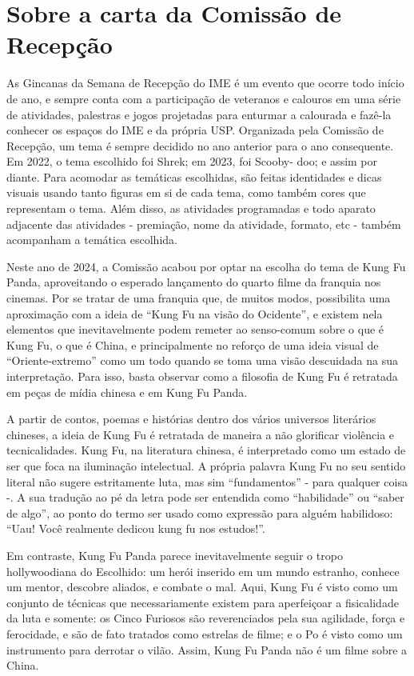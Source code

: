 \section*{Sobre a carta da Comissão de Recepção}
\avisoTextoForms

As Gincanas da Semana de Recepção do IME é um evento que ocorre todo início de ano, e sempre conta com a participação de veteranos e calouros em uma série de atividades, palestras e jogos projetadas para enturmar a calourada e fazê-la conhecer os espaços do IME e da própria USP. Organizada pela Comissão de Recepção, um tema é sempre decidido no ano anterior para o ano consequente. Em 2022, o tema escolhido foi Shrek; em 2023, foi Scooby- doo; e assim por diante. Para acomodar as temáticas escolhidas, são feitas identidades e dicas visuais usando tanto figuras em si de cada tema, como também cores que representam o tema. Além disso, as atividades programadas e todo aparato adjacente das atividades - premiação, nome da atividade, formato, etc - também acompanham a temática escolhida.

Neste ano de 2024, a Comissão acabou por optar na escolha do tema de Kung Fu Panda, aproveitando o esperado lançamento do quarto filme da franquia nos cinemas. Por se tratar de uma franquia que, de muitos modos, possibilita uma aproximação com a ideia de “Kung Fu na visão do Ocidente”, e existem nela elementos que inevitavelmente podem remeter ao senso-comum sobre o que é Kung Fu, o que é China, e principalmente no reforço de uma ideia visual de “Oriente-extremo” como um todo quando se toma uma visão descuidada na sua interpretação. Para isso, basta observar como a filosofia de Kung Fu é retratada em peças de mídia chinesa e em Kung Fu Panda.

A partir de contos, poemas e histórias dentro dos vários universos literários chineses, a ideia de Kung Fu é retratada de maneira a não glorificar violência e tecnicalidades. Kung Fu, na literatura chinesa, é interpretado como um estado de ser que foca na iluminação intelectual. A própria palavra Kung Fu no seu sentido literal não sugere estritamente luta, mas sim “fundamentos” - para qualquer coisa -. A sua tradução ao pé da letra pode ser entendida como “habilidade” ou “saber de algo”, ao ponto do termo ser usado como expressão para alguém habilidoso: “Uau! Você realmente dedicou kung fu nos estudos!”.

Em contraste, Kung Fu Panda parece inevitavelmente seguir o tropo hollywoodiana do Escolhido: um herói inserido em um mundo estranho, conhece um mentor, descobre aliados, e combate o mal. Aqui, Kung Fu é visto como um conjunto de técnicas que necessariamente existem para aperfeiçoar a fisicalidade da luta e somente: os Cinco Furiosos são reverenciados pela sua agilidade, força e ferocidade, e são de fato tratados como estrelas de filme; e o Po é visto como um instrumento para derrotar o vilão. Assim, Kung Fu Panda não é um filme sobre a China.

